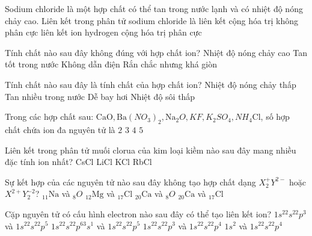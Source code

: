 	\begin{ex}
		Sodium chloride là một hợp chất có thể tan trong nước lạnh và có nhiệt độ nóng chảy cao. Liên kết trong phân tử sodium chloride là liên kết
		\choice
		{cộng hóa trị không phân cực}
		{\True liên kết ion}
		{hydrogen}
		{cộng hóa trị phân cực}
		\loigiai{}
	\end{ex}
	
	\begin{ex}
		Tính chất nào sau đây không đúng với hợp chất ion?
		\choice
		{Nhiệt độ nóng chảy cao}
		{Tan tốt trong nước}
		{\True Không dẫn điện}
		{Rắn chắc nhưng khá giòn}
		\loigiai{}
	\end{ex}
	
	\begin{ex}
		Tính chất nào sau đây là tính chất của hợp chất ion?
		\choice
		{Nhiệt độ nóng chảy thấp}
		{\True Tan nhiều trong nước}
		{Dễ bay hơi}
		{Nhiệt độ sôi thấp}
		\loigiai{}
	\end{ex}
	
	\begin{ex}
		Trong các hợp chất sau: $\mathrm{CaO}, \mathrm{Ba}\left(NO_3\right)_2, \mathrm{Na}_2O, KF, K_2SO_4, NH_4\mathrm{Cl}$, số hợp chất chứa ion đa nguyên tử là
		\choice
		{$2$}
		{\True $3$}
		{$4$}
		{$5$}
		\loigiai{}
	\end{ex}
	
	\begin{ex}
		Liên kết trong phân tử muối clorua của kim loại kiềm nào sau đây mang nhiều đặc tính ion nhất?
		\choice
		{CsCl}
		{LiCl}
		{\True KCl}
		{RbCl}
		\loigiai{}
	\end{ex}
	
	\begin{ex}
		Sự kết hợp của các nguyên tử nào sau đây không tạo hợp chất dạng $X_2^{+} Y^{2-}$ hoặc $X^{2+} Y_2^{-2}$?
		\choice
		{$_{11} \mathrm{Na}$ và $_8O$}
		{$_{12} \mathrm{Mg}$ và $_{17} \mathrm{Cl}$}
		{\True $_{20} \mathrm{Ca}$ và $_8O$}
		{$_{20} \mathrm{Ca}$ và $_{17} \mathrm{Cl}$}
		\loigiai{}
	\end{ex}
	
	\begin{ex}
		Cặp nguyên tử có cấu hình electron nào sau đây có thể tạo liên kết ion?
		\choice
		{$1s^22s^22p^3$ và $1s^22s^22p^5$}
		{\True $1s^22s^22p^63s^1$ và $1s^22s^22p^5$}
		{$1s^22s^22p^3$ và $1s^22s^22p^4$}
		{$1s^2$ và $1s^22s^22p^4$}
		\loigiai{}
	\end{ex}
	
